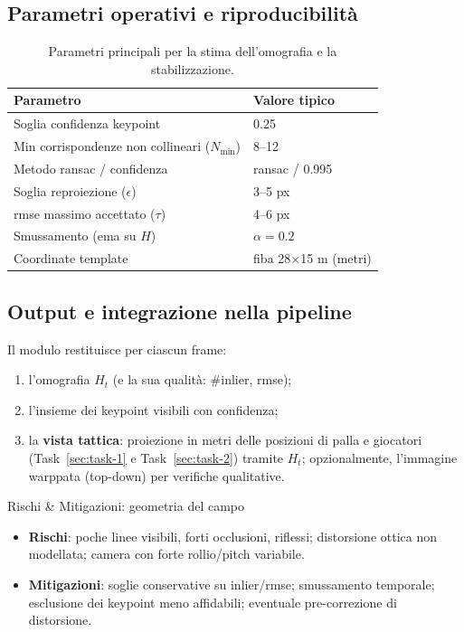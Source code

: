 \documentclass[12pt,a4paper,openright,twoside]{book}
\begin{document}
\subsection{Parametri operativi e riproducibilità}
\label{subsec:params-homography}

\begin{table}[h]
  \centering
  \small
  \caption{Parametri principali per la stima dell'omografia e la stabilizzazione.}
  \label{tab:params_homography}
  \begin{tabular}{l l}
    \toprule
    \textbf{Parametro} & \textbf{Valore tipico} \\
    \midrule
    Soglia confidenza keypoint & 0.25 \\
    Min corrispondenze non collineari ($N_{\min}$) & 8--12 \\
    Metodo \ac{ransac} / confidenza & \ac{ransac} / 0.995 \\
    Soglia reproiezione ($\epsilon$) & 3--5 px \\
    \ac{rmse} massimo accettato ($\tau$) & 4--6 px \\
    Smussamento (\ac{ema} su $H$) & $\alpha=0.2$ \\
    Coordinate template & \ac{fiba} 28$\times$15 m (metri) \\
    \bottomrule
  \end{tabular}
\end{table}

\subsection{Output e integrazione nella pipeline}
\label{subsec:output-integrazione}

Il modulo restituisce per ciascun frame:
\begin{enumerate}
  \item l'omografia $H_t$ (e la sua qualità: \#inlier, \ac{rmse});
  \item l'insieme dei keypoint visibili con confidenza;
  \item la \textbf{vista tattica}: proiezione in metri delle posizioni di palla e giocatori
  (Task~\ref{sec:task-1} e Task~\ref{sec:task-2}) tramite $H_t$; opzionalmente,
  l'immagine warppata (top-down) per verifiche qualitative.
\end{enumerate}

\begin{riskbox}{Rischi \& Mitigazioni: geometria del campo}
  \label{box:rischi-mitigazioni-campo}
  \begin{itemize}
    \item \textbf{Rischi}: poche linee visibili, forti occlusioni, riflessi; distorsione ottica
    non modellata; camera con forte rollio/pitch variabile.
    \item \textbf{Mitigazioni}: soglie conservative su inlier/\ac{rmse}; smussamento temporale;
    esclusione dei keypoint meno affidabili; eventuale pre-correzione di distorsione.
  \end{itemize}
\end{riskbox}
\end{document}
